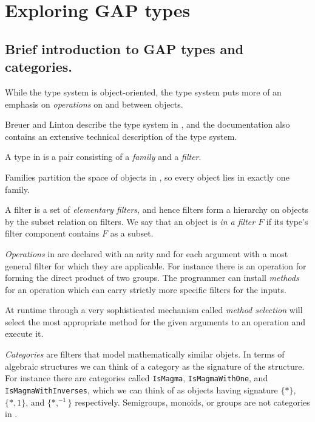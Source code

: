 \section{Exploring GAP types}\label{sec:gaptypes} 

\subsection{Brief introduction to GAP types and categories.}\label{gap-types-intro}


While the \Sage type system is object-oriented, the \GAP type
system puts more of an emphasis on \emph{operations} on and between objects.

Breuer and Linton describe the \GAP type system in \cite{breuer-linton}, and
the \GAP documentation \cite{GAP4} also contains an extensive technical
description of the \GAP type system.

A type in \GAP is a pair consisting of a \emph{family} and a \emph{filter}.

Families partition the space of objects in \GAP, so every object lies in exactly one family.

A filter is a set of \emph{elementary filters}, and hence filters form a hierarchy on
objects by the subset relation on filters.
We say that an object is \emph{in a filter $F$} if its type's filter component
contains $F$ as a subset.

\emph{Operations} in \GAP are declared with an arity and for each argument with a
most general filter for which they are applicable. For instance there is an operation
for forming the direct product of two groups.
The programmer can install \emph{methods} for an operation which can carry strictly
more specific filters for the inputs.

At runtime \GAP through a very sophisticated mechanism called \emph{method selection} will
select the most appropriate method for the given arguments to an operation and execute it.

\emph{Categories} are filters that model mathematically similar objets. In terms of
algebraic structures we can think of a category as the signature of the structure.
For instance there are categories called \texttt{IsMagma}, \texttt{IsMagmaWithOne}, and
\texttt{IsMagmaWithInverses}, which we can think of as objects having signature $\{ * \}$,
$\{*,1\}$, and $\{*,^{-1}\}$ respectively. Semigroups, monoids, or groups are not
categories in \GAP.

